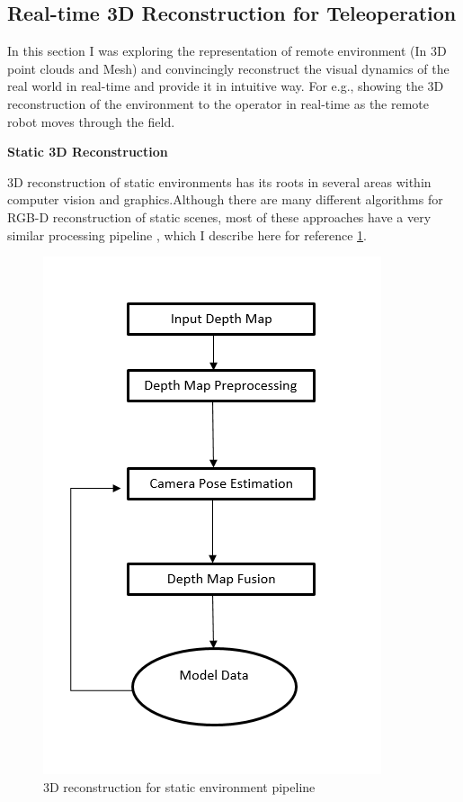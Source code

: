 \subsection{Real-time 3D Reconstruction for Teleoperation}

In this section I was exploring the representation of remote environment (In 3D point clouds and Mesh) and convincingly reconstruct the visual dynamics of the real world in real-time and provide it in intuitive way. For e.g., showing the 3D reconstruction of the environment to the operator in real-time as the remote robot moves through the field.

\textbf{Static 3D Reconstruction}

3D reconstruction of static environments has its roots in several areas within computer vision and graphics.Although there are many different algorithms for RGB-D reconstruction of static scenes, most of these approaches have a very similar processing pipeline \cite{Zollhofer2018}, which I describe here for reference \ref{fig:staticrec}.

\begin{figure}[h]
    \centering
    \includegraphics[scale=0.5]{images/StaticRecon.PNG}
    \caption{3D reconstruction for static environment pipeline}
    \label{fig:staticrec}
\end{figure}


